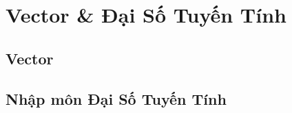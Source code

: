   
\chapter{Vector \& Đại Số Tuyến Tính}


\section{Vector}
 

\section{Nhập môn Đại Số Tuyến Tính}



\begin{refsection}
\nocite{linear123, cack,3b1b}
\printbibliography
\end{refsection}